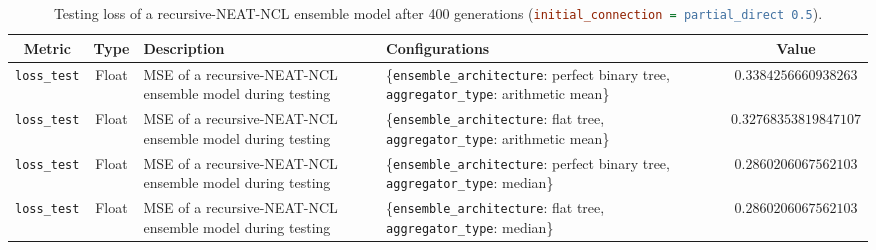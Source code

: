 \begin{table}[H]
    \centering
    \begin{tabular}{|c|c|p{4cm}|p{5cm}|c|}
        \hline
        Metric & Type & Description & Configurations & Value \\
        \hline
        \small\texttt{loss\_test} & Float & MSE of a recursive-NEAT-NCL ensemble model during testing & \{\texttt{ensemble\_architecture}: perfect binary tree, \texttt{aggregator\_type}: arithmetic mean\} & $0.3384256660938263$ \\
        \hline
        \small\texttt{loss\_test} & Float & MSE of a recursive-NEAT-NCL ensemble model during testing & \{\texttt{ensemble\_architecture}: flat tree, \texttt{aggregator\_type}: arithmetic mean\} & $0.32768353819847107$ \\
        \hline
        \small\texttt{loss\_test} & Float & MSE of a recursive-NEAT-NCL ensemble model during testing & \{\texttt{ensemble\_architecture}: perfect binary tree, \texttt{aggregator\_type}: median\} & $0.2860206067562103$ \\
        \hline
        \small\texttt{loss\_test} & Float & MSE of a recursive-NEAT-NCL ensemble model during testing & \{\texttt{ensemble\_architecture}: flat tree, \texttt{aggregator\_type}: median\} & $0.2860206067562103$ \\
        \hline
    \end{tabular}
    \caption{Testing loss of a recursive-NEAT-NCL ensemble model after 400 generations (\lstinline[language=ini]|initial_connection = partial_direct 0.5|). }
    \label{table:experiment_6_neat_ncl_partial_direct}
\end{table}

